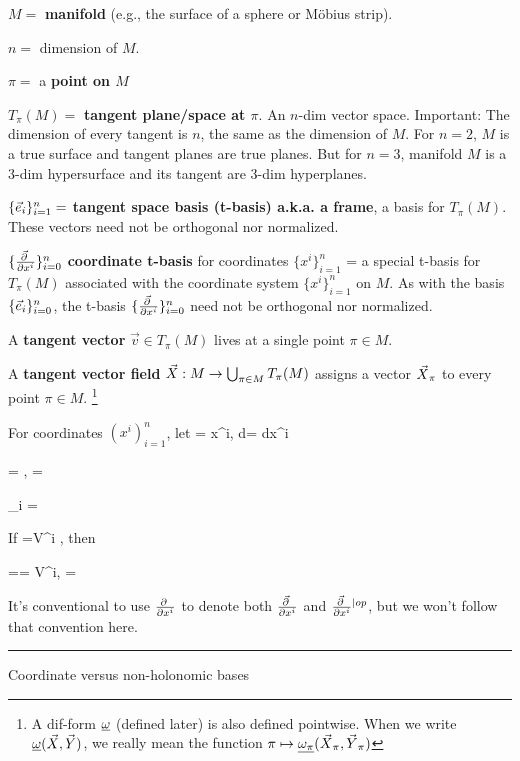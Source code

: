 $M=$  {\bf manifold} (e.g., the surface of a sphere or M\"obius strip). 

$n=$ dimension of $M$.

$\pi=$ a
{\bf point on $M$}

$T_\pi (M)=$
{\bf tangent plane/space at $\pi$}.
An $n$-dim vector space. Important: The dimension of every tangent  is $n$, the  same as the dimension of $M$. For $n=2$, $M$ is a true surface and tangent planes are true planes. But 
for $n=3$, manifold $M$ is a 3-dim hypersurface and its tangent  are 3-dim hyperplanes.



$\{{\vec{e}}_i\}_{i=1}^n=$ {\bf tangent space basis (t-basis) a.k.a. a frame}, a basis for $T_\pi(M)$. These vectors need not be orthogonal nor normalized.

$\{\frac{\vec{\partial}\;}{\partial x^i}\}_{i=0}^n$ {\bf coordinate t-basis}
for coordinates
$\{x^i\}_{i=1}^n$ = a special t-basis for $T_\pi(M)$
associated with the coordinate system $\{x^i\}_{i=1}^n$ on $M$.
 As with the basis  $\{{\vec{e}}_i\}_{i=0}^n$, the  t-basis $\{\frac{\vec{\partial}\;}{\partial x^i}\}_{i=0}^n$ need not be orthogonal nor normalized.

A {\bf tangent vector} $\vec{v}\in T_\pi(M)$
lives at a single point $\pi\in M$.

A {\bf tangent vector field} ${\vec{X}}:
M\rightarrow \bigcup_{\pi\in M}T_\pi(M)$ assigns a vector ${\vec{X}}_\pi$
 to every point $\pi\in M$.
\footnote{
A dif-form $\ul{\omega}$ (defined later) is also defined pointwise. When we write
$\ul{\omega}(\vecX, \vecY)$,
we really mean the function
$\pi \mapsto
\ul{\omega_\pi}(\vecX_\pi, \vecY_\pi)
$}



For coordinates $(x^i)_{i=1}^n$, let
\beq
{}= x^i,
\quad d\vecr = dx^i 
\eeq

\beq
{}=
,\quad
{}=
\quad{}
\eeq

\beq
{}_i = 
\eeq

If
\beq
\vecV=V^i ,
\eeq
then

\beq
\oper{\vecV}=\vecV\cdot \nabla=
 V^i,
\quad \oper{\vecV} 
=\vecV
\eeq


It's conventional
to use $\frac{\partial\;}{\partial x^i}$
to denote both
$\frac{\vec{\partial}\;}{\partial x^i}$ and
${\frac{\vec{\partial}\;}{\partial x^i}}{}^{|op}$,
but we won't follow
that convention here.
\\
\hrule
Coordinate versus non-holonomic bases


